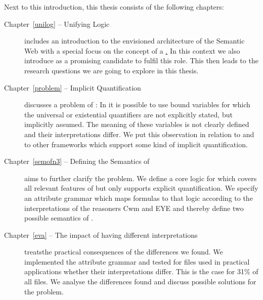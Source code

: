 Next to this introduction, this thesis consists of the following chapters:

\begin{description}
\item[Chapter~\ref{unilog} -- Unifying Logic]
includes an introduction to the envisioned  architecture of the Semantic Web with a special focus 
on the concept of a \ul. In this context we also introduce \nthreelogic as a promising candidate to fulfil this role.
This then leads to the research questions we are going to explore in this thesis.

\item[Chapter~\ref{problem} -- Implicit Quantification] discusses 
a problem of \nthreelogic:
In  \nthree it is possible to
use bound variables for which the universal or existential quantifiers are not explicitly stated,
but implicitly assumed. 
The meaning of these variables is not clearly defined and their interpretations differ. 
We put this observation in relation to \rdf and to other 
frameworks which support some kind of implicit quantification.

\item[Chapter~\ref{semofn3} -- Defining the Semantics of \nthreelogic]
aims to further clarify the problem.
We define a core logic for \nthreelogic which covers
all relevant features of \nthree but only supports
explicit quantification. 
We specify an attribute grammar which maps \nthree formulas to that logic according to the interpretations of the reasoners Cwm and EYE 
and thereby define two possible
semantics of \nthree.


\item[Chapter~\ref{eva} -- The impact of having different \nthree interpretations]
treats\linebreak the practical consequences of the differences we found. We implemented the attribute grammar and tested for 
files used in practical applications whether their interpretations differ. This is the case for 31\% of all files.
We analyse the differences found and discuss possible solutions for the problem.
% 


\end{description}
